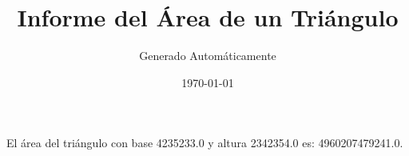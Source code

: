 \documentclass{article}
\begin{document}
        \title{Informe del Área de un Triángulo}
        \author{Generado Automáticamente}
        \date{\today}
        \maketitle
        El área del triángulo con base 4235233.0 y altura 2342354.0 es: 4960207479241.0.
        
\end{document}
